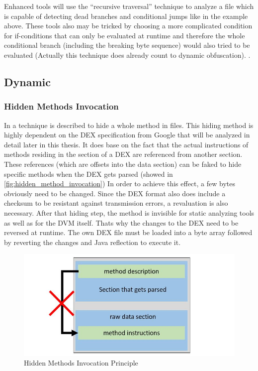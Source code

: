 Enhanced tools will use the ``recursive traversal'' technique to analyze a
file which is capable of detecting dead branches and conditional jumps like in the example above.
These tools also may be tricked by choosing a more complicated condition for
if-conditions that can only be evaluated at runtime and therefore the
whole conditional branch (including the breaking byte sequence) would also tried to be evaluated (Actually this technique does already count to dynamic obfuscation).
\parencite{lvl_imp}.

\subsection{Dynamic}
\subsubsection{Hidden Methods Invocation}
In \parencite{lvl_imp} a technique is described to hide a whole method
in  files. This hiding method is highly dependent on the DEX specification from Google \parencite{dex} that will be analyzed in detail
later in this thesis.
It does base on the fact that the actual instructions of methods residing
in the  section of a DEX are referenced from another section.
These references (which are offsets into the data section) can be faked
to hide specific methods when the DEX gets parsed
(showed in \autoref{fig:hidden_method_invocation}) In order to achieve
this effect, a few bytes obviously need to be changed.
Since the DEX format also does include a checksum to be resistant
against transmission errors, a revaluation is also necessary.
After that hiding step, the method is invisible for static analyzing tools
as well as for the DVM itself. Thats why the changes to the DEX need to
be reversed at runtime. The own DEX file must be loaded into a byte array
followed by reverting the changes and Java reflection to execute it.

\begin{figure}[htb]
  \includegraphics[width=\textwidth]{figures/hidden_method_invocation}
  \caption[Hidden Methods Invocation]{Hidden Methods Invocation Principle}
  \label{fig:hidden_method_invocation}
\end{figure}

